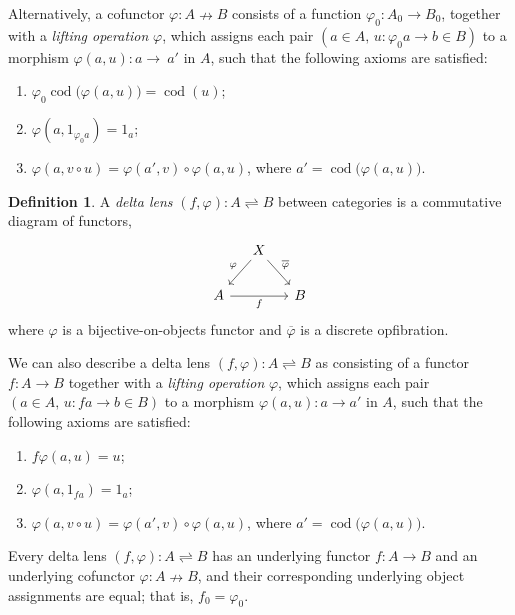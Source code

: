\documentclass[colorlinks = true, a4paper, oneside, reqno, 11pt]{amsart}
\theoremstyle{definition}
\newtheorem{definition}[theorem]{Definition}
\theoremstyle{remark}
\newcommand{\phibar}{\overline{\varphi}}
\DeclareMathOperator{\cod}{cod}
\begin{document}
Alternatively, a cofunctor $\varphi \colon A \nrightarrow B$ consists of a
function $\varphi_{0} \colon A_{0} \rightarrow B_{0}$, 
together with a \emph{lifting operation} $\varphi$, which assigns each pair
$(a \in A, \, u \colon \varphi_{0}a \rightarrow b \in B)$ to a morphism 
$\varphi(a, u) \colon a \rightarrow~a'$ in $A$, such that the following axioms are satisfied: 
\begin{enumerate}[(1)]
\item $\varphi_{0}\cod \big( \varphi(a, u) \big) = \cod(u)$;
\item $\varphi(a, 1_{\varphi_{0}a}) = 1_{a}$;
\item $\varphi(a, v \circ u) = \varphi(a', v) \circ \varphi(a, u)$, 
where $a' = \cod\big( \varphi(a, u) \big)$.
\end{enumerate}

\begin{definition}\label{defn:delta-lens}
A \emph{delta lens} $(f, \varphi) \colon A \rightleftharpoons B$ between categories is 
a commutative diagram of functors, 
\begin{equation}\label{eqn:delta-lens}
\begin{tikzcd}[column sep = small]
& X 
\arrow[ld, "\varphi"']
\arrow[rd, "\phibar"]
& 
\\
A 
\arrow[rr, "f"']
& & B
\end{tikzcd}
\end{equation}
where $\varphi$ is a bijective-on-objects functor and $\phibar$ is a discrete opfibration. 
\end{definition}

We can also describe a delta lens $(f, \varphi) \colon A \rightleftharpoons B$ as 
consisting of a functor $f \colon A \rightarrow B$ together with a \emph{lifting operation}
$\varphi$, which assigns each pair
$(a \in A, \, u \colon fa \rightarrow b \in B)$ to a morphism 
$\varphi(a, u) \colon a \rightarrow a'$ in $A$, such that the following axioms are satisfied: 
\begin{enumerate}[(1)]
\item $f \varphi(a, u) = u$;
\item $\varphi(a, 1_{fa}) = 1_{a}$;
\item $\varphi(a, v \circ u) = \varphi(a', v) \circ \varphi(a, u)$,
where $a' = \cod\big( \varphi(a, u) \big)$.
\end{enumerate}

Every delta lens $(f, \varphi) \colon A \rightleftharpoons B$ has an underlying 
functor $f \colon A \rightarrow B$ and an underlying cofunctor $\varphi \colon A \nrightarrow B$,
and their corresponding underlying object assignments are equal; that is, $f_{0} = \varphi_{0}$. 
\end{document}
